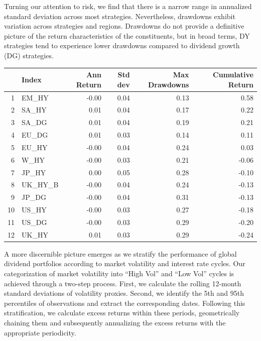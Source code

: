 \documentclass[11pt,preprint, authoryear]{elsarticle}
\let\origtable\table
\let\endorigtable\endtable
\renewenvironment{table}[1][2] {
    \expandafter\origtable\expandafter[H]
} {
    \endorigtable
}
\numberwithin{equation}{section}
\numberwithin{figure}{section}
\numberwithin{table}{section}
\begin{document}
Turning our attention to risk, we find that there is a narrow range in
annualized standard deviation across most strategies. Nevertheless,
drawdowns exhibit variation across strategies and regions. Drawdowns do
not provide a definitive picture of the return characteristics of the
constituents, but in broad terms, DY strategies tend to experience lower
drawdowns compared to dividend growth (DG) strategies.

\begin{table}[H]
\centering
\begin{tabular}{rlrrrr}
  \hline
 & Index & Ann Return & Std dev & Max Drawdowns & Cumulative Return \\ 
  \hline
1 & EM\_HY & -0.00 & 0.04 & 0.13 & 0.58 \\ 
  2 & SA\_HY & 0.01 & 0.04 & 0.17 & 0.22 \\ 
  3 & SA\_DG & 0.01 & 0.04 & 0.19 & 0.21 \\ 
  4 & EU\_DG & 0.01 & 0.03 & 0.14 & 0.11 \\ 
  5 & EU\_HY & -0.00 & 0.04 & 0.24 & 0.03 \\ 
  6 & W\_HY & -0.00 & 0.03 & 0.21 & -0.06 \\ 
  7 & JP\_HY & 0.00 & 0.05 & 0.28 & -0.10 \\ 
  8 & UK\_HY\_B & -0.00 & 0.04 & 0.24 & -0.13 \\ 
  9 & JP\_DG & -0.00 & 0.04 & 0.31 & -0.13 \\ 
  10 & US\_HY & -0.00 & 0.03 & 0.27 & -0.18 \\ 
  11 & US\_DG & -0.00 & 0.03 & 0.29 & -0.20 \\ 
  12 & UK\_HY & 0.01 & 0.03 & 0.29 & -0.24 \\ 
   \hline
\end{tabular}
\caption{Global Index  Portfolio Performance \label{tab1}} 
\end{table}

A more discernible picture emerges as we stratify the performance of
global dividend portfolios according to market volatility and interest
rate cycles. Our categorization of market volatility into ``High Vol''
and ``Low Vol'' cycles is achieved through a two-step process. First, we
calculate the rolling 12-month standard deviations of volatility
proxies. Second, we identify the 5th and 95th percentiles of
observations and extract the corresponding dates. Following this
stratification, we calculate excess returns within these periods,
geometrically chaining them and subsequently annualizing the excess
returns with the appropriate periodicity.
\end{document}
